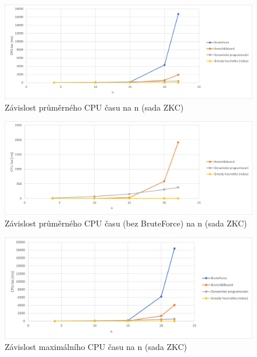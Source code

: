 \documentclass[12pt]{article}
\begin{document}
\begin{figure}[ht]\centering
    \includegraphics[width=1\textwidth, keepaspectratio]{graphs/ZKC/times/zkc_cpu_time_avg.png}
    \caption{Závislost průměrného CPU času na n (sada ZKC)}
    \label{fig:zkc_cpu_time_avg}
\end{figure}

\begin{figure}[ht]\centering
    \includegraphics[width=1\textwidth, keepaspectratio]{graphs/ZKC/times/zkc_cpu_time_avg_without_brute_force.png}
    \caption{Závislost průměrného CPU času (bez BruteForce) na n (sada ZKC)}
    \label{fig:zkc_cpu_time_avg_without_brute_force}
\end{figure}

\begin{figure}[ht]\centering
    \includegraphics[width=1\textwidth, keepaspectratio]{graphs/ZKC/times/zkc_cpu_time_max.png}
    \caption{Závislost maximálního CPU času na n (sada ZKC)}
    \label{fig:zkc_cpu_time_max}
\end{figure}
\end{document}
